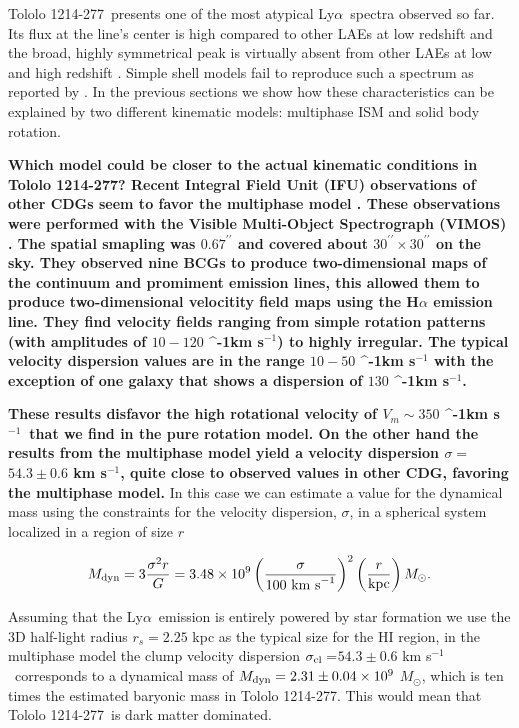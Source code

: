 \documentclass[a4paper,fleqn,usenatbib]{mnras}
\newcommand{\tol}{Tololo 1214-277}
\newcommand{\lya}{\ifmmode{{\rm Ly}\alpha}\else Ly$\alpha$\ \fi}
\newcommand{\kms}{\ifmmode\mathrm{km\ s}^{-1}\else km s$^{-1}$\fi}
\newcommand{\sigmaclump}{$54.3\pm 0.6$ km s$^{-1}$}
\begin{document}
\tol\ presents one of the most atypical \lya spectra observed so far.
Its flux at the line's center is high compared to other LAEs at low
redshift and the broad, highly symmetrical peak is virtually absent from other
LAEs at low and high redshift
\citep{2012ApJ...751...29Y,LARS,Erb14,Trainor16}. 
Simple shell models
fail to reproduce such a spectrum as reported by \cite{2015A&A...578A...7V}.  
In the previous sections we show how these characteristics can be
explained by two different kinematic models: multiphase ISM and solid
body rotation.

{\bf Which model could be closer to the actual kinematic conditions in \tol?  
Recent Integral Field Unit (IFU) observations of other CDGs seem to
favor the multiphase model \citep{2015A&A...577A..21C,2017A&A...600A.125C}. 
These observations  were performed with the Visible Multi-Object Spectrograph (VIMOS)
\citep{2003SPIE.4841.1670L}.
The spatial smapling was $0.67^{\prime\prime}$ and covered about
$30^{\prime\prime}\times 30^{\prime\prime}$ on the sky. 
They observed nine BCGs to produce two-dimensional maps of the
continuum and promiment emission lines, this allowed them to produce 
two-dimensional velocitity field maps using the H$\alpha$ emission
line.
They find velocity fields ranging from simple rotation patterns 
(with amplitudes of $10-120$ \kms) to highly irregular. 
The typical velocity dispersion values are in the range $10-50$ \kms
with the exception of one galaxy that shows a dispersion of $130$
\kms. }

{\bf These results disfavor the high rotational velocity of $V_{m}\sim350$
\kms\  that we find in the pure rotation model. 
On the other hand the results from the multiphase model yield a
velocity dispersion $\sigma=$\sigmaclump, quite close to observed
values in other CDG, favoring the multiphase model.}
In this case we can  estimate a value for the dynamical
mass using the constraints for the velocity dispersion, $\sigma$,  in
a spherical system localized in a region of size $r$    

\begin{equation}
M_{\rm dyn} = 3 \frac{\sigma ^{2}r}{G} = 3.48\times10^{9}
\left(\frac{\sigma}{100\ \mathrm{km\ s}^{-1}}\right)^2\left(\frac{r}{\mathrm{kpc}}\right)
M_{\odot}. 
\end{equation}

Assuming that the \lya emission is entirely powered by star formation 
we use the 3D half-light radius $r_s=2.25$ kpc as the typical size
for the HI region, in the multiphase model the clump velocity dispersion
$\sigma_{\rm{cl}}=$\sigmaclump\  corresponds to a dynamical mass of
$M_{\rm dyn}=2.31\pm0.04 \times 10^{9}$ $M_{\odot}$, which is ten
times the estimated baryonic mass in \tol.
This would mean that \tol\ is dark matter dominated.
\end{document}
